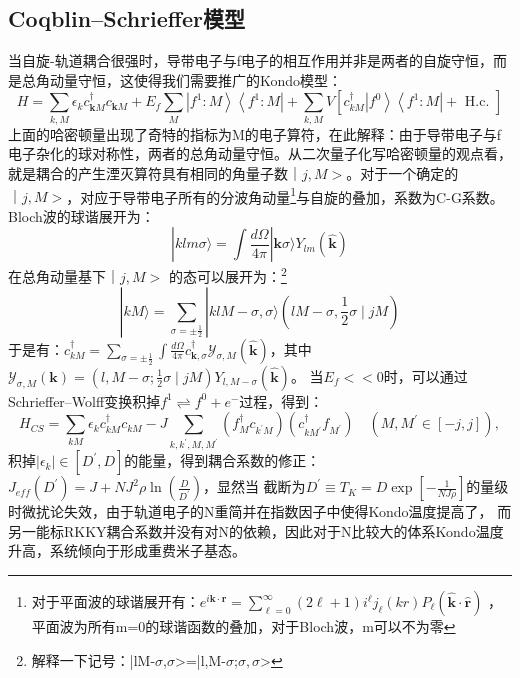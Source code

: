 \documentclass[10pt,openany]{book}
\theoremstyle{thmstyle} %
\theoremstyle{defstyle} %
\theoremstyle{prostyle} %
\begin{document}
\subsection{Coqblin–Schrieffer模型}
当自旋-轨道耦合很强时，导带电子与f电子的相互作用并非是两者的自旋守恒，而是总角动量守恒，这使得我们需要推广的Kondo模型：
\begin{equation}
	H=\sum_{k, M} \epsilon_k c_{\mathbf{k} M}^{\dagger} c_{\mathbf{k} M}+E_f \sum_M\left|f^1: M\right\rangle\left\langle f^1: M\right|+\sum_{k, M} V\left[c_{k M}^{\dagger}\left|f^0\right\rangle\left\langle f^1: M\right|+\text { H.c. }\right]
\end{equation}
上面的哈密顿量出现了奇特的指标为M的电子算符，在此解释：由于导带电子与f电子杂化的球对称性，两者的总角动量守恒。从二次量子化写哈密顿量的观点看，
就是耦合的产生湮灭算符具有相同的角量子数$ ｜j,M> $。对于一个确定的$ ｜j,M> $，对应于导带电子所有的分波角动量\footnote{对于平面波的球谐展开有：$ e^{i \mathbf{k} \cdot \mathbf{r}}=\sum_{\ell=0}^{\infty}(2 \ell+1) i^{\ell} j_{\ell}(k r) P_{\ell}(\hat{\mathbf{k}} \cdot \hat{\mathbf{r}}) $
，平面波为所有m=0的球谐函数的叠加，对于Bloch波，m可以不为零 }与自旋的叠加，系数为C-G系数。Bloch波的球谐展开为：
\begin{equation}
	|k l m \sigma\rangle=\int \frac{d \Omega}{4 \pi}|\mathbf{k} \sigma\rangle Y_{l m}(\hat{\mathbf{k}})
\end{equation}
在总角动量基下$ ｜j,M> $ 的态可以展开为：\footnote{解释一下记号：|lM-$ \sigma $,$ \sigma $>=|l,M-$ \sigma $;$ \sigma,\sigma $>    }
\begin{equation}
	|k M\rangle=\sum_{\sigma= \pm \frac{1}{2}}|k l M-\sigma, \sigma\rangle\left(l M-\sigma, \frac{1}{2} \sigma \mid j M\right)
\end{equation}
于是有：$ c_{k M}^{\dagger}=\sum_{\sigma= \pm \frac{1}{2}} \int \frac{d \Omega}{4 \pi} c_{\mathbf{k}, \sigma}^{\dagger} \mathcal{Y}_{\sigma, M}(\hat{\mathbf{k}}) $，其中$ \mathcal{Y}_{\sigma, M}(\mathbf{k})=\left(l, M-\sigma ; \frac{1}{2} \sigma \mid j M\right) Y_{l, M-\sigma}(\hat{\mathbf{k}}) $。  
当$ E_f<<0 $时，可以通过Schrieffer–Wolff变换积掉$ f^1 \rightleftharpoons f^0+e^{-} $过程，得到：
\begin{equation}
	H_{C S}=\sum_{k M} \epsilon_k c_{k M}^{\dagger} c_{k M}-J \sum_{k, k^{\prime}, M, M^{\prime}}\left(f_M^{\dagger} c_{k^{\prime} M}\right)\left(c_{k M^{\prime}}^{\dagger} f_{M^{\prime}}\right) \quad\left(M, M^{\prime} \in[-j, j]\right),
\end{equation}  
积掉$ \left|\epsilon_k\right| \in\left[D^{\prime}, D\right] $的能量，得到耦合系数的修正：$ J_{e f f}\left(D^{\prime}\right)=J+N J^2 \rho \ln \left(\frac{D}{D^{\prime}}\right) $，显然当
截断为$ D^{\prime} \equiv T_K=D \exp \left[-\frac{1}{N J \rho}\right] $的量级时微扰论失效，由于轨道电子的N重简并在指数因子中使得Kondo温度提高了，
而另一能标RKKY耦合系数并没有对N的依赖，因此对于N比较大的体系Kondo温度升高，系统倾向于形成重费米子基态。
\end{document}
